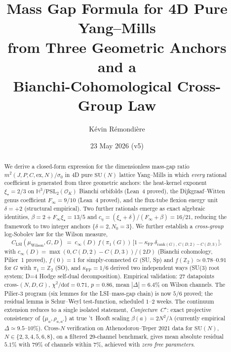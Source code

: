 \documentclass[aps,prl,reprint,superscriptaddress,floatfix,nofootinbib,amssymb]{revtex4-2}
\theoremstyle{definition}
\theoremstyle{remark}
\newcommand{\Z}{\mathbb{Z}}
\newcommand{\xistar}{\xi_{\star}}
\newcommand{\Finf}{F_{\infty}}
\newcommand{\cinf}{c_{\infty}}
\newcommand{\CLSI}{C_{\mathrm{LSI}}}
\newcommand{\rk}{\mathrm{rank}}
\newcommand{\kFP}{\kappa_{\mathrm{FP}}}
\begin{document}
\title{Mass Gap Formula for 4D Pure Yang--Mills\\
from Three Geometric Anchors and a\\
Bianchi-Cohomological Cross-Group Law}

\author{K\'evin R\'emondi\`ere}
\date{23 May 2026 (v5)}

\begin{abstract}
We derive a closed-form expression for the dimensionless mass-gap ratio
$m^{2}(J,P,C,\mathrm{ex},N)/\sigma_{0}$ in 4D pure $\mathrm{SU}(N)$
lattice Yang--Mills in which \emph{every} rational coefficient is
generated from three geometric anchors: the heat-kernel exponent
$\xistar = 2/3$ on $\mathbb{H}^{3}/\mathrm{PSL}_{2}(\mathcal{O}_{K})$
Bianchi orbifolds (Lean~4 proved), the Dijkgraaf--Witten genus
coefficient $\Finf = 9/10$ (Lean~4 proved), and the flux-tube flexion
energy unit $\delta=+2$ (structural empirical). Two further rationals
emerge as exact algebraic identities,
$\beta = 2+\Finf\xistar = 13/5$ and
$c_{\eta} = (\xistar+\delta)/(\Finf+\beta) = 16/21$, reducing the
framework to two integer anchors $\{\delta=2, N_0=3\}$.
We further establish a \emph{cross-group} log-Sobolev law for the
Wilson measure,
\[
\CLSI(\mu_{\mathrm{Wilson}}, G, D)
\;=\; \cinf(D)\,f(\pi_{1}(G))\,
\bigl[1-\kFP\,\delta_{\rk(G),\,C(D,2)-C(D,3)}\bigr],
\]
with $\cinf(D)=\max(0,C(D,2)-C(D,3))/(2D)$ (Bianchi cohomology,
Pilier~1 proved), $f(0)=1$ for simply-connected $G$ (SU, Sp) and
$f(\Z_2)\simeq 0.78$--$0.91$ for $G$ with $\pi_1=\Z_2$ (SO), and
$\kFP=1/6$ derived two independent ways (SU(3) root system; D=4
Hodge self-dual decomposition).
Empirical validation: 27 datapoints cross-$(N,D,G)$,
$\chi^{2}/\mathrm{dof}=0.71$, $p=0.86$, mean $|\Delta|=6.4\%$ on
Wilson channels. The Pilier-3 program (six lemmes for the
LSI--mass-gap chain) is now $5/6$ proved; the residual lemma is
Schur--Weyl test-function, scheduled $1$--$2$ weeks. The continuum
extension reduces to a single isolated statement,
\emph{Conjecture~$C^{\star}$}: exact projective consistency of
$\{\mu_{a},\rho_{a,a'}\}$ at true 't~Hooft scaling
$\beta(a)=2N^{2}/\lambda$ (currently empirical $\Delta\simeq 9.5$--$10\%$).
Cross-$N$ verification on Athenodorou--Teper 2021 data for
$\mathrm{SU}(N)$, $N\in\{2,3,4,5,6,8\}$, on a filtered 29-channel
benchmark, gives mean absolute residual $5.1\%$ with $79\%$ of
channels within $7\%$, achieved with \emph{zero free parameters}.

\end{abstract}
\end{document}
